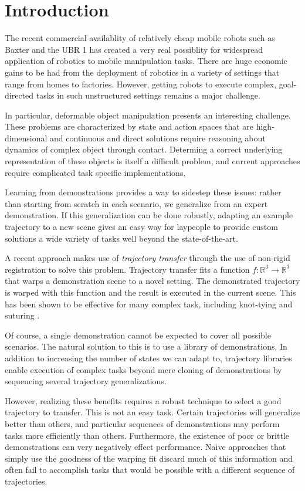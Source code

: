 \section{Introduction}

The recent commercial availablity of relatively cheap mobile robots such as
Baxter and the UBR 1 has created a very real possiblity for widespread
application of robotics to mobile manipulation tasks.  There are huge economic
gains to be had from the deployment of robotics in a variety of settings that
range from homes to factories.  However, getting robots to execute complex,
goal-directed tasks in such unstructured settings remains a major challenge.

In particular, deformable object manipulation presents an interesting challenge.
These problems are characterized by state and action spaces that are high-dimensional 
and continuous and direct solutions require reasoning about dynamics of complex object 
through contact.
Determing a correct underlying representation of these objects is itself a difficult problem,
and current approaches require complicated task specific implementations.

Learning from demonstrations provides a way to sidestep these issues: rather
than starting from scratch in each scenario, we generalize from an expert
demonstration.  If this generalization can be done robustly, adapting an example
trajectory to a new scene gives an easy way for laypeople to provide custom
solutions a wide variety of tasks well beyond the state-of-the-art.

A recent approach makes use of \emph{trajectory transfer} through the use of
non-rigid registration to solve this problem.  Trajectory transfer fits a
function $f:\mathbb{R}^3 \rightarrow \mathbb{R}^3$ that warps a demonstration
scene to a novel setting.  The demonstrated trajectory is warped with this
function and the result is executed in the current scene.  This has been shown
to be effective for many complex task, including knot-tying and suturing
\cite{Schulmanetal_ISRR2013, Schulmanetal_IROS2013}.

Of course, a single demonstration cannot be expected to cover all possible scenarios.
The natural solution to this is to use a library of demonstrations.
In addition to increasing the number of states we can adapt to, trajectory libraries
enable execution of complex tasks beyond mere cloning of demonstrations by sequencing 
several trajectory generalizations.

However, realizing these benefits requires a robust technique to select a good trajectory to
transfer.
This is not an easy task.
Certain trajectories will generalize better than others, and particular sequences of 
demonstrations may perform tasks more efficiently than others.
Furthermore, the existence of poor or brittle demonstrations can very negatively 
effect performance.
Na\"{\i}ve approaches that simply use the goodness of the warping fit discard much of this information and often fail to accomplish tasks that would be possible with a different sequence of trajectories.

